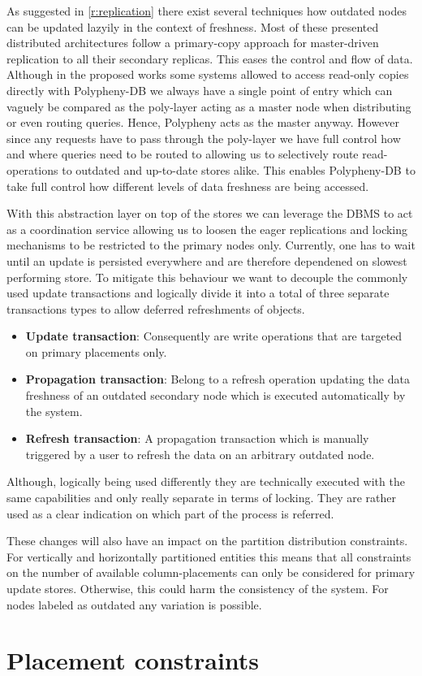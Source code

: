 As suggested in \ref{r:replication} there exist several techniques how outdated nodes can be updated lazyily in the context of freshness.
Most of these presented distributed architectures follow a primary-copy approach for master-driven replication to all their secondary replicas.
This eases the control and flow of data. Although in the proposed works some systems allowed to access read-only copies directly
with Polypheny-DB we always have a single point of entry which can vaguely be compared as the poly-layer acting as a master node
when distributing or even routing queries. Hence, Polypheny acts as the master anyway. However since any requests have to pass through the poly-layer
we have full control how and where queries need to be routed to allowing us to selectively route read-operations to outdated and up-to-date stores alike.
This enables Polypheny-DB to take full control how different levels of data freshness are being accessed.

With this abstraction layer on top of the stores we can leverage the DBMS to act as a coordination service allowing us to loosen the eager replications and 
locking mechanisms to be restricted to the primary nodes only. Currently, one has to wait until an update is persisted everywhere and are therefore
dependened on slowest performing store.
To mitigate this behaviour we want to decouple the commonly used update transactions and logically divide it into a total of three separate transactions types
to allow deferred refreshments of objects.
\begin{itemize}
    \item \textbf{Update transaction}: Consequently are write operations that are targeted on primary placements only.
    \item \textbf{Propagation transaction}: Belong to a refresh operation updating the data freshness of an outdated secondary node which is 
    executed automatically by the system.
    \item \textbf{Refresh transaction}: A propagation transaction which is manually triggered by a user to refresh the data on an arbitrary outdated node.
\end{itemize}

Although, logically being used differently they are technically executed with the same capabilities and only really separate in terms of locking.
They are rather used as a clear indication on which part of the process is referred.

These changes will also have an impact on the partition distribution constraints. For vertically and horizontally partitioned 
entities this means that all constraints on the number of available column-placements can only be considered for primary update stores. Otherwise, this could harm
the consistency of the system. For nodes labeled as outdated any variation is possible.



\section{Placement constraints}
